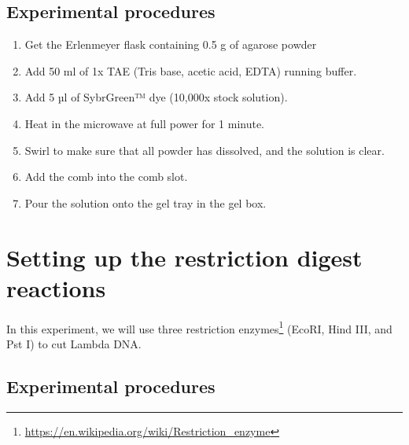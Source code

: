 \documentclass[]{book}
\providecommand{\tightlist}{%
  \setlength{\itemsep}{0pt}\setlength{\parskip}{0pt}}
\let\rmarkdownfootnote\footnote%
\def\footnote{\protect\rmarkdownfootnote}
\renewcommand{\href}[2]{#2\footnote{\url{#1}}}
\theoremstyle{definition}
\theoremstyle{definition}
\theoremstyle{definition}
\theoremstyle{remark}
\begin{document}
\subsection{Experimental procedures}\label{experimental-procedures-32}

\begin{enumerate}
\def\labelenumi{\arabic{enumi}.}
\setcounter{enumi}{1}
\tightlist
\item
  Get the Erlenmeyer flask containing 0.5 g of agarose powder
\item
  Add 50 ml of 1x TAE (Tris base, acetic acid, EDTA) running buffer.
\item
  Add 5 µl of SybrGreen™ dye (10,000x stock solution).
\item
  Heat in the microwave at full power for 1 minute.
\item
  Swirl to make sure that all powder has dissolved, and the solution is
  clear.
\item
  Add the comb into the comb slot.
\item
  Pour the solution onto the gel tray in the gel box.
\end{enumerate}

\section{Setting up the restriction digest
reactions}\label{setting-up-the-restriction-digest-reactions}

In this experiment, we will use three
\href{https://en.wikipedia.org/wiki/Restriction_enzyme}{restriction
enzymes} (EcoRI, Hind III, and Pst I) to cut Lambda DNA.

\subsection{Experimental procedures}\label{experimental-procedures-33}
\end{document}
